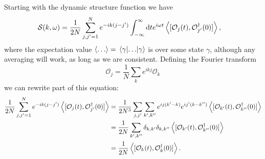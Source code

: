 \documentclass[11pt, a4paper]{report} %
\begin{document}
Starting with the dynamic structure function we have
\begin{align}
  	\mathcal{S}(k,\omega) &= \frac{1}{2N} \sum_{j,j'=1}^{N} e^{-ik(j-j')} \int_{-\infty}^{\infty}\dd t e^{i\omega t}\expval{[\mathcal{O}_j(t),\mathcal{O}_{j'}^{\dagger}(0)]},
\end{align}
where the expectation value \(\expval{\ldots} = \matrixel{\gamma}{\ldots}{\gamma}\) is over some state \(\gamma\), although any averaging will work, as long as we are consistent.
Defining the Fourier transform
\begin{equation}
  \mathcal{O}_j = \frac{1}{N} \sum_k e^{ikj} \mathcal{O}_k
\end{equation}
we can rewrite part of this equation:
\begin{align}
  \frac{1}{2N} \sum_{j,j'=1}^{N} e^{-ik(j-j')} \expval{[\mathcal{O}_j(t),\mathcal{O}_{j'}^{\dagger}(0)]} &= \frac{1}{2N^3} \sum_{j, j'}\sum_{k',k''} e^{ij(k'-k)}e^{ij'(k-k'')}  \expval{[\mathcal{O}_{k'}(t),\mathcal{O}_{k''}^{\dagger}(0)]}\\
&= \frac{1}{2N} \sum_{k',k''} \delta_{k,k'}\delta_{k,k''}  \expval{[\mathcal{O}_{k'}(t),\mathcal{O}_{k''}^{\dagger}(0)]} \\
&= \frac{1}{2N}  \expval{[\mathcal{O}_{k}(t),\mathcal{O}_{k}^{\dagger}(0)]}.
\end{align}
\end{document}
